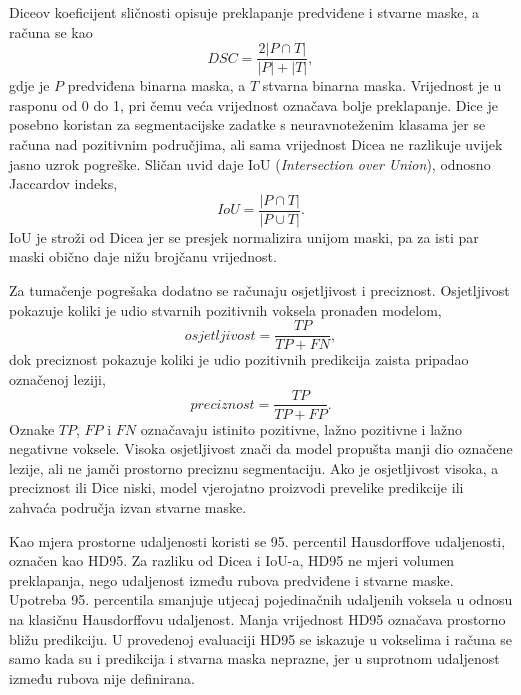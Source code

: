 \documentclass[a4paper,12pt,oneside]{article}
\begin{document}
Diceov koeficijent sličnosti opisuje preklapanje predviđene i stvarne maske, a računa se kao
\begin{equation}\label{eq:dice}
DSC = \frac{2|P \cap T|}{|P| + |T|},
\end{equation}
gdje je $P$ predviđena binarna maska, a $T$ stvarna binarna maska. Vrijednost je u rasponu od 0 do 1, pri čemu veća vrijednost označava bolje preklapanje. Dice je posebno koristan za segmentacijske zadatke s neuravnoteženim klasama jer se računa nad pozitivnim područjima, ali sama vrijednost Dicea ne razlikuje uvijek jasno uzrok pogreške. Sličan uvid daje IoU (\textit{Intersection over Union}), odnosno Jaccardov indeks,
\begin{equation}\label{eq:iou}
IoU = \frac{|P \cap T|}{|P \cup T|}.
\end{equation}
IoU je stroži od Dicea jer se presjek normalizira unijom maski, pa za isti par maski obično daje nižu brojčanu vrijednost.

Za tumačenje pogrešaka dodatno se računaju osjetljivost i preciznost. Osjetljivost pokazuje koliki je udio stvarnih pozitivnih voksela pronađen modelom,
\begin{equation}\label{eq:sensitivity}
osjetljivost = \frac{TP}{TP + FN},
\end{equation}
dok preciznost pokazuje koliki je udio pozitivnih predikcija zaista pripadao označenoj leziji,
\begin{equation}\label{eq:precision}
preciznost = \frac{TP}{TP + FP}.
\end{equation}
Oznake $TP$, $FP$ i $FN$ označavaju istinito pozitivne, lažno pozitivne i lažno negativne voksele. Visoka osjetljivost znači da model propušta manji dio označene lezije, ali ne jamči prostorno preciznu segmentaciju. Ako je osjetljivost visoka, a preciznost ili Dice niski, model vjerojatno proizvodi prevelike predikcije ili zahvaća područja izvan stvarne maske.

Kao mjera prostorne udaljenosti koristi se 95. percentil Hausdorffove udaljenosti, označen kao HD95. Za razliku od Dicea i IoU-a, HD95 ne mjeri volumen preklapanja, nego udaljenost između rubova predviđene i stvarne maske. Upotreba 95. percentila smanjuje utjecaj pojedinačnih udaljenih voksela u odnosu na klasičnu Hausdorffovu udaljenost. Manja vrijednost HD95 označava prostorno bližu predikciju. U provedenoj evaluaciji HD95 se iskazuje u vokselima i računa se samo kada su i predikcija i stvarna maska neprazne, jer u suprotnom udaljenost između rubova nije definirana.
\end{document}
